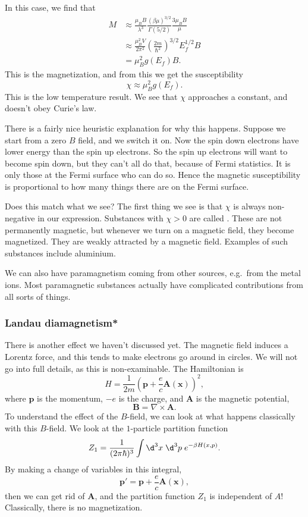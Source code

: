 \documentclass[a4paper]{article}
\begin{document}
In this case, we find that
\begin{align*}
  M &\approx \frac{\mu_BB}{\lambda^3} \frac{(\beta \mu)^{3/2}}{\Gamma(5/2)} \frac{3\mu_BB}{\mu} \\
  &\approx \frac{\mu_B^2 V}{2\pi^2}\left(\frac{2m}{\hbar^2}\right)^{3/2} E_f^{1/2} B\\
  &= \mu_B^2 g(E_f) B.
\end{align*}
This is the magnetization, and from this we get the susceptibility
\[
  \chi \approx \mu_B^2 g(E_f).
\]
This is the low temperature result. We see that $\chi$ approaches a constant, and doesn't obey Curie's law.

There is a fairly nice heuristic explanation for why this happens. Suppose we start from a zero $B$ field, and we switch it on. Now the spin down electrons have lower energy than the spin up electrons. So the spin up electrons will want to become spin down, but they can't all do that, because of Fermi statistics. It is only those at the Fermi surface who can do so. Hence the magnetic susceptibility is proportional to how many things there are on the Fermi surface.

Does this match what we see? The first thing we see is that $\chi$ is always non-negative in our expression. Substances with $\chi > 0$ are called . These are not permanently magnetic, but whenever we turn on a magnetic field, they become magnetized. They are weakly attracted by a magnetic field. Examples of such substances include aluminium.

We can also have paramagnetism coming from other sources, e.g.\ from the metal ions. Most paramagnetic substances actually have complicated contributions from all sorts of things.

\subsubsection*{Landau diamagnetism*}
There is another effect we haven't discussed yet. The magnetic field induces a Lorentz force, and this tends to make electrons go around in circles. We will not go into full details, as this is non-examinable. The Hamiltonian is
\[
  H = \frac{1}{2m} \left(\mathbf{p} + \frac{e}{c} \mathbf{A}(\mathbf{x})\right)^2,
\]
where $\mathbf{p}$ is the momentum, $-e$ is the charge, and $\mathbf{A}$ is the magnetic potential,
\[
  \mathbf{B} = \nabla \times \mathbf{A}.
\]
To understand the effect of the $B$-field, we can look at what happens classically with this $B$-field. We look at the $1$-particle partition function
\[
  Z_1 = \frac{1}{(2\pi \hbar)^{3}} \int \d^3 x\; \d^3 p\; e^{-\beta H(x, p)}.
\]
By making a change of variables in this integral,
\[
  \mathbf{p}' = \mathbf{p} + \frac{e}{c} \mathbf{A}(\mathbf{x}),
\]
then we can get rid of $\mathbf{A}$, and the partition function $Z_1$ is independent of $A$! Classically, there is no magnetization.
\end{document}
